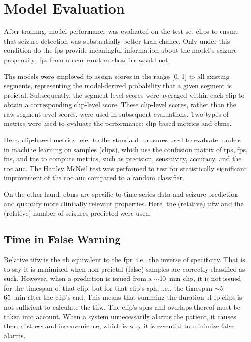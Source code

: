 \section{Model Evaluation} \label{sec:model-evaluation}
After training, model performance was evaluated on the test set clips to ensure that seizure detection was substantially better than chance. 
Only under this condition do the \glspl{fp} provide meaningful information about the model’s seizure propensity; \glspl{fp} from a near‑random classifier would not.


The models were employed to assign scores in the range [0, 1] to all existing segments, representing the model-derived probability that a given segment is preictal.  
Subsequently, the segment-level scores were averaged within each clip to obtain a corresponding clip-level score.  
These clip-level scores, rather than the raw segment-level scores, were used in subsequent evaluations.
Two types of metrics were used to evaluate the performance: clip-based metrics and \glspl{ebm}.

Here, clip-based metrics refer to the standard measures used to evaluate models in machine learning on samples (clips), which use the confusion matrix of \glspl{tp}, \glspl{fp}, \glspl{fn}, and \glspl{tn} to compute metrics, such as precision, sensitivity, accuracy, and the \gls{roc auc}.
The Hanley McNeil test \parencite{hanley_method_1983} was performed to test for statistically significant improvement of the \gls{roc auc} compared to a random classifier.

On the other hand, \glspl{ebm} are specific to time-series data and seizure prediction and quantify more clinically relevant properties.
Here, the (relative) \gls{tifw} \parencite{mormann_seizure_2007, eberlein_machine_2025} and the (relative) number of seizures predicted were used.

\subsection{Time in False Warning} \label{subsec:tifw}
Relative \gls{tifw} is the \gls{eb} equivalent to the \gls{fpr}, i.e., the inverse of specificity.
That is to say it is minimized when non-preictal (false) samples are correctly classified as such.
However, when a prediction is issued from a $\sim$\SI{10}{\minute} clip, it is not issued for the timespan of that clip, but for that clip's \gls{sph}, i.e., the timespan $\sim$\num{5}--\SI{65}{\minute} after the clip's end.
This means that summing the duration of \gls{fp} clips is not sufficient to calculate the \gls{tifw}.
The clip's \glspl{sph} and overlaps thereof must be taken into account.
When a system unnecessarily alarms the patient, it causes them distress and inconvenience, which is why it is essential to minimize false alarms.

